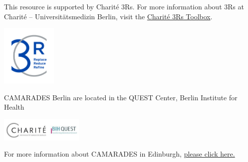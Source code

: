 \documentclass[
]{book}
\begin{document}
This resource is supported by Charité 3Rs. For more information about 3Rs at Charité -- Universitätsmedizin Berlin, visit the \href{https://charite3r.charite.de/en/charite_3r_toolbox/}{Charité 3Rs Toolbox}.

\includegraphics[width=0.2\textwidth,height=\textheight]{figs/C3R_Screen_Farbe.jpg}

CAMARADES Berlin are located in the QUEST Center, Berlin Institute for Health

\includegraphics[width=0.3\textwidth,height=\textheight]{charite-BIHquest.jpg}

For more information about CAMARADES in Edinburgh, \href{https://www.ed.ac.uk/clinical-brain-sciences/research/camarades}{please click here.}

  
\end{document}
